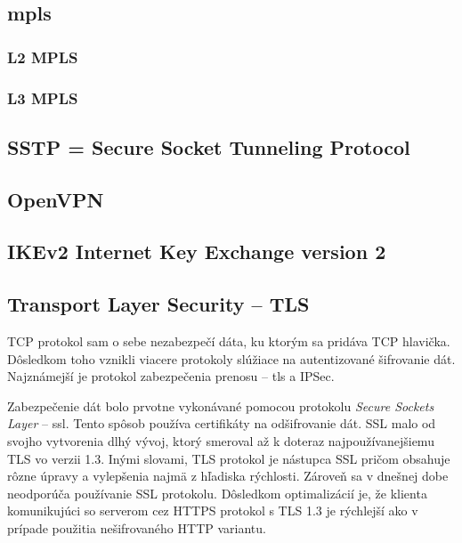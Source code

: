 \subsection{\acrfull{mpls}}
\subsubsection{L2 MPLS}
\subsubsection{L3 MPLS}


\subsection{SSTP = Secure Socket Tunneling Protocol }
\subsection{OpenVPN}

\subsection{IKEv2 Internet Key Exchange version 2}

\subsection{Transport Layer Security -- TLS}
TCP protokol sam o sebe nezabezpečí dáta, ku ktorým sa pridáva TCP hlavička. Dôsledkom toho vznikli viacere protokoly slúžiace na autentizované šifrovanie dát. Najznámejší je protokol zabezpečenia prenosu -- \acrshort{tls} a IPSec.

Zabezpečenie dát bolo prvotne vykonávané pomocou protokolu \textit{Secure Sockets Layer} -- \acrshort{ssl}. Tento spôsob používa certifikáty na odšifrovanie dát. SSL malo od svojho vytvorenia dlhý vývoj, ktorý smeroval až k doteraz najpoužívanejšiemu TLS vo verzii 1.3. Inými slovami, TLS protokol je nástupca SSL pričom obsahuje rôzne úpravy a vylepšenia najmä z hľadiska rýchlosti. Zároveň sa v dnešnej dobe neodporúča používanie SSL protokolu. Dôsledkom optimalizácií je, že klienta komunikujúci so serverom cez HTTPS protokol s TLS 1.3 je rýchlejší ako v prípade použitia nešifrovaného HTTP variantu. 

